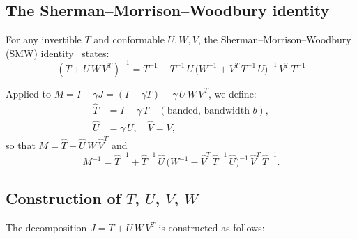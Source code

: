 \documentclass[11pt]{article}
\newcommand{\bw}{b}
\begin{document}
\subsection{The Sherman--Morrison--Woodbury identity}

For any invertible $T$ and conformable $U, W, V$, the
Sherman--Morrison--Woodbury (SMW) identity~\cite{Woodbury1950,
Hager1989} states:
\begin{equation}
  \boxed{(T + U\,W\,V^{T})^{-1} =
  T^{-1} - T^{-1}\,U\,
  \bigl(W^{-1} + V^{T}\,T^{-1}\,U\bigr)^{-1}\,
  V^{T}\,T^{-1}}
  \label{eq:smw}
\end{equation}

Applied to $M = I - \gamma J = (I - \gamma T)
- \gamma\,U\,W\,V^{T}$, we define:
\begin{align}
  \hat{T} &= I - \gamma\,T \quad (\text{banded, bandwidth } \bw),
  \label{eq:That} \\
  \hat{U} &= \gamma\,U, \quad \hat{V} = V,
  \label{eq:UVhat}
\end{align}
so that $M = \hat{T} - \hat{U}\,W\,\hat{V}^{T}$ and
\begin{equation}
  M^{-1} = \hat{T}^{-1}
  + \hat{T}^{-1}\,\hat{U}\,
  \bigl(W^{-1} - \hat{V}^{T}\,\hat{T}^{-1}\,\hat{U}\bigr)^{-1}\,
  \hat{V}^{T}\,\hat{T}^{-1}.
  \label{eq:prec}
\end{equation}

\subsection{Construction of $T$, $U$, $V$, $W$}

The decomposition $J = T + U\,W\,V^{T}$ is constructed as follows:
\end{document}
